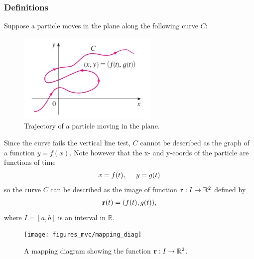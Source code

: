 \documentclass[12pt,letterpaper,reqno]{article}
\numberwithin{equation}{section}
\newcommand{\R}{\ensuremath{\mathbb R}}
\newcommand{\bbr}{{\bf r}}
\begin{document}
{\subsubsection{Definitions}
Suppose a particle moves in the plane along the following curve $C$:
	\begin{figure}[h]
		\begin{center}
		\includegraphics[scale=0.5]{figures_mvc/plane_curve}
	\end{center}
	\caption{Trajectory of a particle moving in the plane.}
	\end{figure}
Since the curve fails the vertical line test, $C$ cannot be described as the graph of a function $y=f(x)$. Note however that the x- and y-coords of the particle are functions of time
\begin{align*}
	x=f(t), \hspace{0.5cm} y=g(t)
\end{align*}
so the curve $C$ can be described as the image of function ${\bf r}:I \to \mathbb{R}^2$ defined by 
\begin{align*}
	\bbr(t)=(f(t),g(t)),
\end{align*}
where $I=[a,b]$ is an interval in $\R$. 
\begin{figure}[h]
	\begin{center}
		\texttt{[image: figures\_mvc/mapping\_diag]}
	\end{center}
	\caption{A mapping diagram showing the function $\bbr:I \to \R^2$.}
\end{figure}

}
\end{document}
